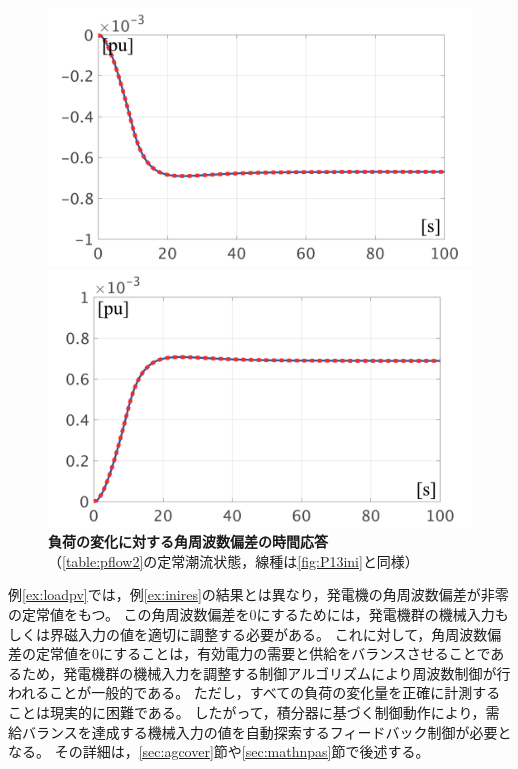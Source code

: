 \documentclass[tombow,dvipdfmx]{corona-a5-1.1}
\begin{document}
\begin{figure}[t]
  \centering
  {
  \begin{minipage}{0.49\linewidth}
    \centering
    \includegraphics[width = 1.0\linewidth]{figs/P3mi}
  \end{minipage}
  \begin{minipage}{0.49\linewidth}
    \centering
    \includegraphics[width = 1.0\linewidth]{figs/P3pl}
  \end{minipage}
  \medskip
  \caption{\textbf{負荷の変化に対する角周波数偏差の時間応答}
  \\ \centering（\ref{table:pflow2}の定常潮流状態，線種は\ref{fig:P13ini}と同様）}
  \label{fig:P3load}
  }
\medskip
\end{figure}

例\ref{ex:loadpv}では，例\ref{ex:inires}の結果とは異なり，発電機の角周波数偏差が非零の定常値をもつ。
この角周波数偏差を0にするためには，発電機群の機械入力もしくは界磁入力の値を適切に調整する必要がある。
これに対して，角周波数偏差の定常値を0にすることは，有効電力の需要と供給をバランスさせることであるため，発電機群の機械入力を調整する制御アルゴリズムにより周波数制御が行われることが一般的である。
ただし，すべての負荷の変化量を正確に計測することは現実的に困難である。
したがって，積分器に基づく制御動作により，需給バランスを達成する機械入力の値を自動探索するフィードバック制御が必要となる。
その詳細は，\ref{sec:agcover}節や\ref{sec:mathnpas}節で後述する。
\end{document}

